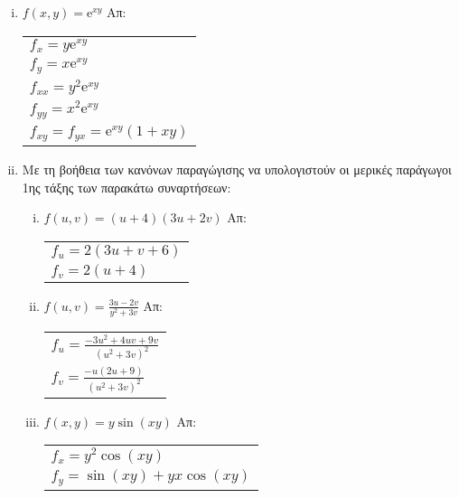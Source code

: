 \documentclass[a4paper,table]{report}
\begin{document}
\begin{enumerate}
\begin{enumerate}[i)]
      \item $f(x,y)= \mathrm{e}^{xy}$ \hfill Απ: \begin{tabular}{l}
          $f_x= y \mathrm{e}^{xy} $ \\ 
          $f_y= x \mathrm{e}^{xy} $ \\ 
          $f_{xx}=y^2 \mathrm{e}^{xy} $ \\
          $f_{yy}=x^2 \mathrm{e}^{xy} $ \\
          $f_{xy} = f_{yx} = \mathrm{e}^{xy} (1+xy) $
        \end{tabular}

      \item Με τη βοήθεια των κανόνων παραγώγισης να υπολογιστούν οι μερικές 
        παράγωγοι 1ης τάξης των παρακάτω συναρτήσεων:

        \begin{enumerate}[i)]
          \item $ f(u,v) = (u+4)(3u+2v) $ \hfill Απ: \begin{tabular}{l}
              $ f_{u} = 2(3u+v+6) $ \\
              $ f_{v} = 2(u+4) $ 
            \end{tabular}

          \item $ f(u,v) = \frac{3u-2v}{y^{2}+3v} $ \hfill Απ: \begin{tabular}{l}
              $ f_{u} = \frac{-3u^{2}+4uv+9v}{(u^{2}+3v)^{2}} $ \\
              $ f_{v} = \frac{-u(2u+9)}{(u^{2}+3v)^{2}} $ 
            \end{tabular}

          \item $f(x,y)=y\sin (xy)$ \hfill Απ: \begin{tabular}{l}
              $f_x=y^2\cos(xy)$ \\ 
              $f_y=\sin(xy)+yx\cos(xy)$
            \end{tabular}
        \end{enumerate}

    \end{enumerate}
\end{enumerate}
\end{document}
